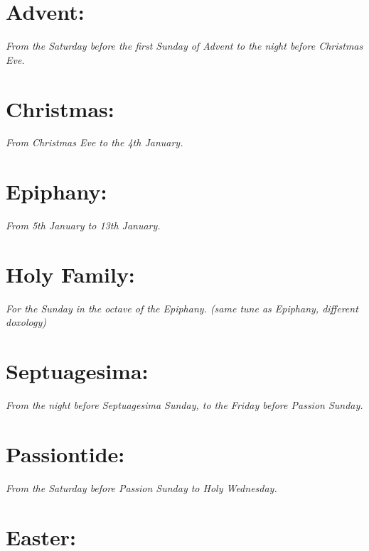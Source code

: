 \documentclass[a5paper,12pt,twoside,openany]{memoir}
\newcommand\rubrics[1]{\textit{#1}}
\begin{document}
\section{Advent:}

\rubrics{From the Saturday before the first Sunday of Advent to the night before Christmas Eve.}


\section{Christmas:}

\rubrics{From Christmas Eve to the 4th January.}


\section{Epiphany:}

\rubrics{From 5th January to 13th January.}


\section{Holy Family:}

\rubrics{For the Sunday in the octave of the Epiphany. (same tune as Epiphany, different doxology)}



\section{Septuagesima:}

\rubrics{From the night before Septuagesima Sunday, to the Friday before Passion Sunday.}


\section{Passiontide:}

\rubrics{From the Saturday before Passion Sunday to Holy Wednesday.}


\section{Easter:}
\end{document}
